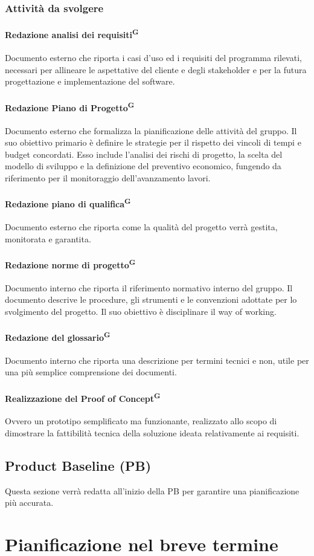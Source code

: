 \documentclass[a4paper, 11pt]{article}
\newcommand{\subsubsubsection}[1]{\paragraph{#1}}
\begin{document}
\subsubsection{Attività da svolgere}
\subsubsubsection{Redazione analisi dei requisiti\textsuperscript{G}}
Documento esterno che riporta i casi d'uso ed i requisiti del programma rilevati, necessari per allineare le aspettative del cliente e degli stakeholder e per la futura progettazione e implementazione del software.
\subsubsubsection{Redazione Piano di Progetto\textsuperscript{G}}
Documento esterno che formalizza la pianificazione delle attività del gruppo. Il suo obiettivo primario è definire le strategie per il rispetto dei vincoli di tempi e budget concordati.
Esso include l'analisi dei rischi di progetto, la scelta del modello di sviluppo e la definizione del preventivo economico, fungendo da riferimento per il monitoraggio dell'avanzamento lavori.
\subsubsubsection{Redazione piano di qualifica\textsuperscript{G}}
Documento esterno che riporta come la qualità del progetto verrà gestita, monitorata e garantita.
\subsubsubsection{Redazione norme di progetto\textsuperscript{G}}
Documento interno che riporta il riferimento normativo interno del gruppo. Il documento descrive le procedure, gli strumenti e le convenzioni adottate per lo svolgimento del progetto. Il suo obiettivo è disciplinare il way of working.
\subsubsubsection{Redazione del glossario\textsuperscript{G}}
Documento interno che riporta una descrizione per termini tecnici e non, utile per una più semplice comprensione dei documenti.
\subsubsubsection{Realizzazione del Proof of Concept\textsuperscript{G}}
Ovvero un prototipo semplificato ma funzionante, realizzato allo scopo di dimostrare la fattibilità tecnica della soluzione ideata relativamente ai requisiti.

\subsection{Product Baseline 
(PB)}
Questa sezione verrà redatta all'inizio della PB per garantire una pianificazione più accurata.

\newpage

\section{Pianificazione nel breve termine} \label{pianificazione_breve_termine}
\end{document}
